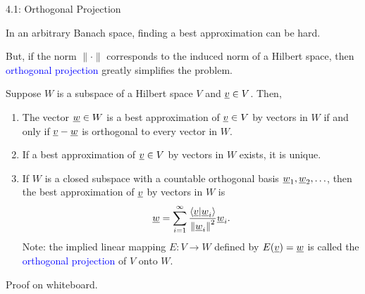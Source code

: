\documentclass[10pt,letterpaper,english]{beamer}
\begin{document}
\begin{frame}{4.1: Orthogonal Projection}

In an arbitrary Banach space, finding a best approximation can be hard.

\vspace{2mm}

But, if the norm $\| \cdot \|$ corresponds to the induced norm of a Hilbert space, then \textcolor{blue}{orthogonal projection} greatly simplifies the problem.

\begin{theorem} Suppose $W$ is a subspace of a Hilbert space $V$ and $\underline{v} \in V$.
Then,
\begin{enumerate}
\item The vector $\underline{w} \in W$ is a best approximation of $\underline{v} \in V$ by vectors in $W$ if and only if $\underline{v} - \underline{w}$ is orthogonal to every vector in $W$.
\item If a best approximation of $\underline{v} \in V$ by vectors in $W$ exists, it is unique.
\item If $W$ is a closed subspace with a countable orthogonal basis $\underline{w}_1, \underline{w}_2, \ldots$, then the best approximation of $\underline{v}$ by vectors in $W$ is \vspace{-1.5mm}
\begin{equation*}
\vecnot{w} = \sum_{i=1}^\infty \frac{ \left\langle \vecnot{v} | \vecnot{w}_i \right\rangle }{ \left\| \vecnot{w}_i \right\|^2 } \vecnot{w}_i . \vspace{-1mm}
\end{equation*}
Note: the implied linear mapping $E\colon V \to W$ defined by $E(\underline{v}) = \underline{w}$ is called the \textcolor{blue}{orthogonal projection} of $V$ onto $W$.
\end{enumerate}
\end{theorem}

Proof on whiteboard.

\end{frame}

\end{document}
